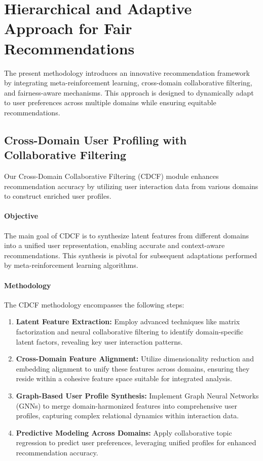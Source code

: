 \section{Hierarchical and Adaptive Approach for Fair Recommendations}

The present methodology introduces an innovative recommendation framework by integrating meta-reinforcement learning, cross-domain collaborative filtering, and fairness-aware mechanisms. This approach is designed to dynamically adapt to user preferences across multiple domains while ensuring equitable recommendations.

\subsection{Cross-Domain User Profiling with Collaborative Filtering}

Our Cross-Domain Collaborative Filtering (CDCF) module enhances recommendation accuracy by utilizing user interaction data from various domains to construct enriched user profiles.

\paragraph{Objective}
The main goal of CDCF is to synthesize latent features from different domains into a unified user representation, enabling accurate and context-aware recommendations. This synthesis is pivotal for subsequent adaptations performed by meta-reinforcement learning algorithms.

\paragraph{Methodology}
The CDCF methodology encompasses the following steps:
\begin{enumerate}
    \item \textbf{Latent Feature Extraction:} Employ advanced techniques like matrix factorization  and neural collaborative filtering to identify domain-specific latent factors, revealing key user interaction patterns.
    
    \item \textbf{Cross-Domain Feature Alignment:} Utilize dimensionality reduction and embedding alignment to unify these features across domains, ensuring they reside within a cohesive feature space suitable for integrated analysis.
  
    \item \textbf{Graph-Based User Profile Synthesis:} Implement Graph Neural Networks (GNNs) to merge domain-harmonized features into comprehensive user profiles, capturing complex relational dynamics within interaction data.
    
    \item \textbf{Predictive Modeling Across Domains:} Apply collaborative topic regression to predict user preferences, leveraging unified profiles for enhanced recommendation accuracy.
\end{enumerate}

